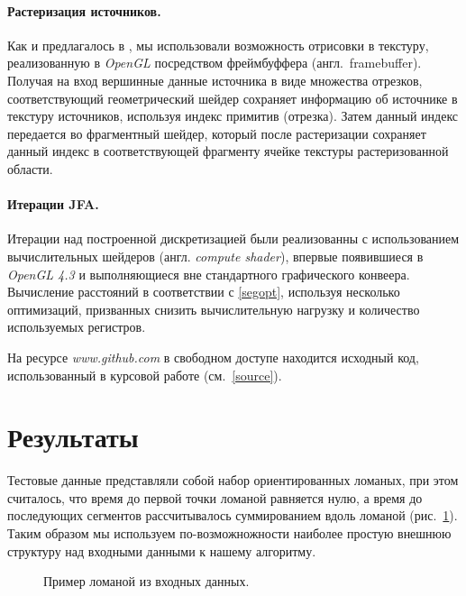 \documentclass[12pt]{article}
\begin{document}
\paragraph{Растеризация источников.} Как и предлагалось в \cite{gvd}, мы 
использовали возможность отрисовки в текстуру, реализованную в \emph{OpenGL}
посредством фреймбуффера (англ.~framebuffer). Получая на вход вершинные данные
источника в виде множества отрезков, соответствующий геометрический шейдер 
сохраняет информацию об источнике в текстуру источников, используя индекс
примитив (отрезка). Затем данный индекс передается во фрагментный шейдер,
который после растеризации сохраняет данный индекс в соответствующей фрагменту
ячейке текстуры растеризованной области.

\paragraph{Итерации JFA.} Итерации над построенной дискретизацией были
реализованны с использованием вычислительных шейдеров (англ. \emph{compute shader}),
впервые появившиеся в \emph{OpenGL 4.3} и выполняющиеся вне стандартного
графического конвеера. Вычисление расстояний в соответствии с \ref{segopt},
используя несколько оптимизаций, призванных снизить вычислительную нагрузку и 
количество используемых регистров.

На ресурсе \emph{www.github.com} в свободном доступе находится исходный код, 
использованный в курсовой работе (см.~\ref{source}).

\section{Результаты}
Тестовые данные представляли собой набор ориентированных ломаных, при этом
считалось, что время до первой точки ломаной равняется нулю, а время до 
последующих сегментов рассчитывалось суммированием вдоль ломаной (рис.~\ref{fig_input}).
Таким образом мы используем по-возможножности наиболее простую внешнюю структуру
над входными данными к нашему алгоритму. 
\begin{figure}
\label{fig_input}
\begin{center}
\end{center}
\caption{Пример ломаной из входных данных.}
\end{figure}
\end{document}
